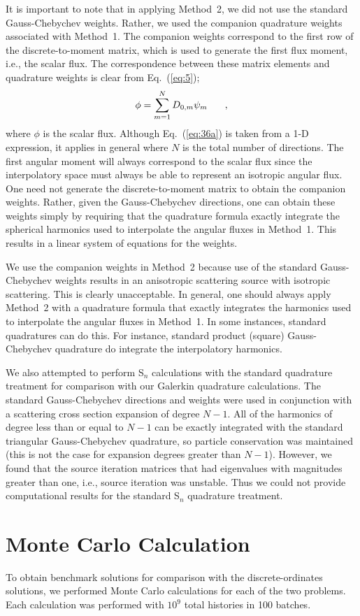 \documentclass[12pt]{article}
\newcommand{\be}{\begin{equation}}
\newcommand{\ee}{\end{equation}}
\newcommand{\pec}{\hspace{0.25in},}
\newcommand{\LEQ}[1]{\label{eq:#1}}
\newcommand{\EQ}[1]{Eq.~(\ref{eq:#1})}
\begin{document}
\begin{center}
It is important to note that in applying Method~2, we did not use the standard Gauss-Chebychev weights. Rather, we used 
the companion quadrature weights associated with Method~1. The companion weights correspond to the first row of the 
discrete-to-moment matrix, which is used to generate the first flux moment, i.e., the scalar flux. The correspondence 
between these matrix elements and quadrature weights is clear from \EQ{5};
\be
\phi = \sum_{m=1}^{N} D_{0,m} \psi_m \pec
\LEQ{36a}
\ee
where $\phi$ is the scalar flux.  Although \EQ{36a} is taken from a 1-D expression, it applies in general where $N$ is 
the total number of directions. The first angular moment will always correspond to the scalar flux since the interpolatory 
space must always be able to represent an isotropic angular flux. One need not generate the discrete-to-moment matrix to obtain 
the companion weights.  Rather, given the Gauss-Chebychev directions, 
one can obtain these weights simply by requiring that the quadrature formula exactly integrate the spherical harmonics 
used to interpolate the angular fluxes in Method~1. This results in a linear system of equations for the weights. 

We use the companion weights in Method~2  because use of the standard Gauss-Chebychev weights results in an anisotropic scattering 
source with isotropic scattering.  This is clearly unacceptable. In general, one should always apply Method~2 with a quadrature formula 
that exactly integrates the harmonics used to interpolate the angular fluxes in Method~1.  In some instances, standard quadratures can do 
this. For instance, standard product (square) Gauss-Chebychev quadrature do integrate the interpolatory harmonics.

We also attempted to perform S$_n$ calculations with the standard quadrature treatment for comparison with our Galerkin
quadrature calculations. The standard Gauss-Chebychev directions and weights were used in conjunction 
with a scattering cross section expansion of degree $N-1$. All of the harmonics of degree less than or equal to $N-1$ can be 
exactly integrated with the standard triangular Gauss-Chebychev quadrature, so particle conservation was maintained (this is not the case 
for expansion degrees greater than $N-1$).  However, we found that the source iteration matrices that had eigenvalues with magnitudes greater 
than one, i.e., source iteration was unstable. Thus we could not provide computational results for the standard S$_n$ quadrature treatment.       

\section{Monte Carlo Calculation}
To obtain benchmark solutions for comparison with the discrete-ordinates solutions, we performed Monte Carlo calculations for each of the 
two problems. Each calculation was performed with $10^9$ total histories in 100 batches.


\end{center}
\end{document}
